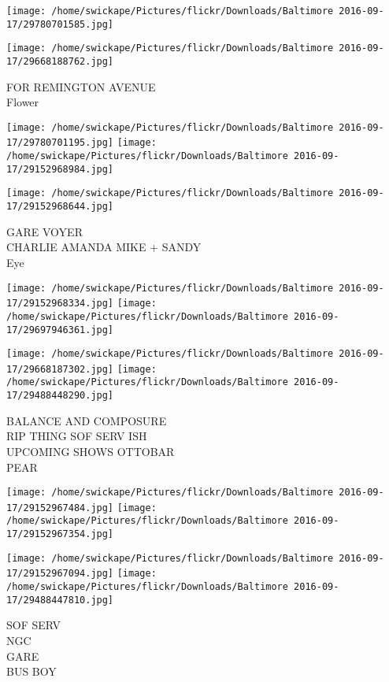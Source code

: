 \documentclass[10pt,letterpaper]{article}
\begin{document}
\texttt{[image: /home/swickape/Pictures/flickr/Downloads/Baltimore 2016-09-17/29780701585.jpg]}

\vspace{0.25in}
\texttt{[image: /home/swickape/Pictures/flickr/Downloads/Baltimore 2016-09-17/29668188762.jpg]}

FOR REMINGTON AVENUE\\
Flower
\pagebreak

\texttt{[image: /home/swickape/Pictures/flickr/Downloads/Baltimore 2016-09-17/29780701195.jpg]}
\texttt{[image: /home/swickape/Pictures/flickr/Downloads/Baltimore 2016-09-17/29152968984.jpg]}

\vspace{0.25in}
\texttt{[image: /home/swickape/Pictures/flickr/Downloads/Baltimore 2016-09-17/29152968644.jpg]}

GARE VOYER\\
CHARLIE AMANDA MIKE + SANDY\\
Eye
\pagebreak

\texttt{[image: /home/swickape/Pictures/flickr/Downloads/Baltimore 2016-09-17/29152968334.jpg]}
\texttt{[image: /home/swickape/Pictures/flickr/Downloads/Baltimore 2016-09-17/29697946361.jpg]}

\texttt{[image: /home/swickape/Pictures/flickr/Downloads/Baltimore 2016-09-17/29668187302.jpg]}
\texttt{[image: /home/swickape/Pictures/flickr/Downloads/Baltimore 2016-09-17/29488448290.jpg]}

BALANCE AND COMPOSURE\\
RIP THING SOF SERV ISH\\
UPCOMING SHOWS OTTOBAR\\
PEAR
\pagebreak

\texttt{[image: /home/swickape/Pictures/flickr/Downloads/Baltimore 2016-09-17/29152967484.jpg]}
\texttt{[image: /home/swickape/Pictures/flickr/Downloads/Baltimore 2016-09-17/29152967354.jpg]}

\texttt{[image: /home/swickape/Pictures/flickr/Downloads/Baltimore 2016-09-17/29152967094.jpg]}
\texttt{[image: /home/swickape/Pictures/flickr/Downloads/Baltimore 2016-09-17/29488447810.jpg]}

SOF SERV\\
NGC\\
GARE\\
BUS BOY
\pagebreak
\end{document}

